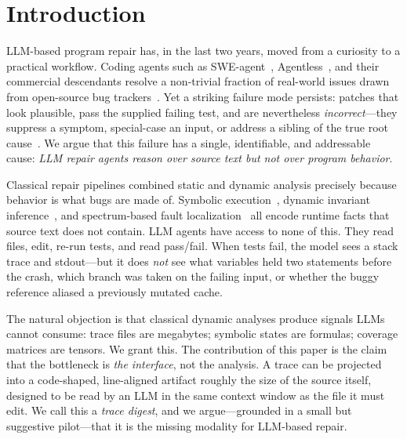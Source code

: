 \documentclass[sigconf,review,anonymous,nonacm]{acmart}
\begin{document}

\maketitle

\section{Introduction}
\label{sec:intro}

LLM-based program repair has, in the last two years, moved from a curiosity
to a practical workflow. Coding agents such as
SWE-agent~\cite{yang2024sweagent}, Agentless~\cite{xia2024agentless}, and
their commercial descendants resolve a non-trivial fraction of real-world
issues drawn from open-source bug
trackers~\cite{jimenez2024swebench}. Yet a striking failure mode persists:
patches that look plausible, pass the supplied failing test, and are
nevertheless \emph{incorrect}---they suppress a symptom, special-case an
input, or address a sibling of the true root
cause~\cite{xia2023plastic,liu2020efficacy}. We argue that this failure has
a single, identifiable, and addressable cause: \emph{LLM repair agents
reason over source text but not over program behavior}.

Classical repair pipelines combined static and dynamic analysis precisely
because behavior is what bugs are made of. Symbolic
execution~\cite{cadar2008klee}, dynamic invariant
inference~\cite{ernst2007daikon}, and spectrum-based fault
localization~\cite{wong2016survey} all encode runtime facts that source
text does not contain. LLM agents have access to none of this. They read
files, edit, re-run tests, and read pass/fail. When tests fail, the model
sees a stack trace and stdout---but it does \emph{not} see what variables
held two statements before the crash, which branch was taken on the failing
input, or whether the buggy reference aliased a previously mutated cache.

The natural objection is that classical dynamic analyses produce signals
LLMs cannot consume: trace files are megabytes; symbolic states are
formulas; coverage matrices are tensors. We grant this. The contribution of
this paper is the claim that the bottleneck is \emph{the interface}, not
the analysis. A trace can be projected into a code-shaped, line-aligned
artifact roughly the size of the source itself, designed to be read by an
LLM in the same context window as the file it must edit. We call this a
\emph{trace digest}, and we argue---grounded in a small but suggestive
pilot---that it is the missing modality for LLM-based repair.
\end{document}
